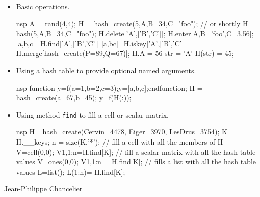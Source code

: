 \begin{examples}
\begin{itemize}
\item Basic operations.
\begin{mintednsp}{nsp}
 A = rand(4,4);
 H = hash_create(5,A,B=34,C="foo"); 
 // or shortly H = hash(5,A,B=34,C="foo");
 H.delete['A',['B','C']];
 H.enter[A,B='foo',C=3.56];
 [a,b,c]=H.find['A',['B','C']]
 [a,bc]=H.iskey['A',['B','C']]
 H.merge[hash_create(P=89,Q=67)];
 H.A = 56 
 str = 'A'
 H(str) = 45;
\end{mintednsp}
\item Using a hash table to provide optional named arguments.
\begin{mintednsp}{nsp}
 function y=f(a=1,b=2,c=3);y=[a,b,c];endfunction;
 H = hash_create(a=67,b=45);
 y=f(H(:));
\end{mintednsp}
\item Using method \verb+find+ to fill a cell or scalar matrix.
\begin{mintednsp}{nsp}
  H= hash_create(Cervin=4478, Eiger=3970, LesDrus=3754);
  K= H.__keys;
  n = size(K,'*');
  // fill a cell with all the members of H
  V=cell(0,0);
  V{1,1:n}=H.find[K];
  // fill a scalar matrix with all the hash table values 
  V=ones(0,0);
  V{1,1:n} = H.find[K];
  // fills a list with all the hash table values 
  L=list();
  L(1:n)= H.find[K];
\end{mintednsp}
\end{itemize}
\end{examples}

\begin{authors}
  Jean-Philippe Chancelier
\end{authors}
